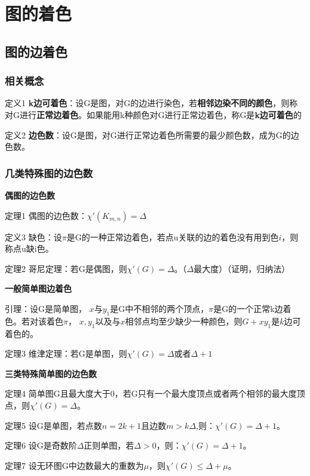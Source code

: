 \documentclass{article}
\begin{document}
\section{图的着色}

\subsection{图的边着色}

\subsubsection{相关概念}

定义1 \textbf{k边可着色}：设G是图，对G的边进行染色，若\textbf{相邻边染不同的颜色}，则称对G进行\textbf{正常边着色}。如果能用k种颜色对G进行正常边着色，称G是\textbf{k边可着色}的

定义2 \textbf{边色数}：设G是图，对G进行正常边着色所需要的最少颜色数，成为G的边色数。

\subsubsection{几类特殊图的边色数}

\textbf{偶图的边色数}

定理1 偶图的边色数：$\chi'(K_{m,n}) = \Delta$

定义3 缺色：设$\pi$是G的一种正常边着色，若点u关联的边的着色没有用到色$i$，则称点u缺i色。

定理2 哥尼定理：若G是偶图，则$\chi'(G) = \Delta$。（$\Delta$最大度）（证明，归纳法）

\textbf{一般简单图边着色}

引理：设G是简单图， $x$与$y_1$是G中不相邻的两个顶点，$\pi$是G的一个正常k边着色。若对该着色$\pi$， $x,y_1$以及与$x$相邻点均至少缺少一种颜色，则$G+xy_1$是$k$边可着色的。

定理3 维津定理：若G是单图，则$\chi'(G) = \Delta \text{或者} \Delta + 1$

\textbf{三类特殊简单图的边色数}

定理4 简单图G且最大度大于0，若G只有一个最大度顶点或者两个相邻的最大度顶点，则$\chi'(G) = \Delta$。

定理5 设G是单图，若点数$n = 2k+1$且边数$m > k\Delta$,则：$\chi'(G) = \Delta + 1$。

定理6 设G是奇数阶$\Delta$正则单图，若$\Delta > 0$，则：$\chi'(G) = \Delta + 1$。

定理7 设无环图G中边数最大的重数为$\mu$，则$\chi'(G) \le \Delta + \mu$。
\end{document}

